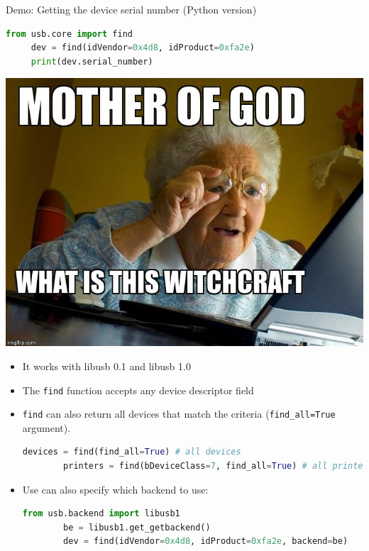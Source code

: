 \documentclass[pdf]{beamer}
\begin{document}
\begin{frame}[fragile]{Demo: Getting the device serial number (Python version)}
  \begin{minipage}{.55\linewidth}
    \tiny
    \pause
    \begin{lstlisting}[language=Python]
     from usb.core import find
     dev = find(idVendor=0x4d8, idProduct=0xfa2e)
     print(dev.serial_number)
    \end{lstlisting}
  \end{minipage}
  \hspace{.05\linewidth}
  \begin{minipage}{.35\linewidth}
    \pause
    \includegraphics[scale=0.15]{img/witchcraft.jpg}
  \end{minipage}

  \begin{itemize}
    \tiny
    \pause
    \item It works with libusb 0.1 and libusb 1.0
    \pause
    \item The \texttt{find} function accepts any device descriptor field
    \pause
    \item \texttt{find} can also return all devices that match the criteria
      (\texttt{find\_all=True} argument).
      \begin{lstlisting}[language=Python]
        devices = find(find_all=True) # all devices
        printers = find(bDeviceClass=7, find_all=True) # all printers
      \end{lstlisting}
    \pause
    \item Use can also specify which backend to use:
      \begin{lstlisting}[language=Python]
        from usb.backend import libusb1
        be = libusb1.get_getbackend()
        dev = find(idVendor=0x4d8, idProduct=0xfa2e, backend=be)
      \end{lstlisting}
  \end{itemize}
\end{frame}
\end{document}
